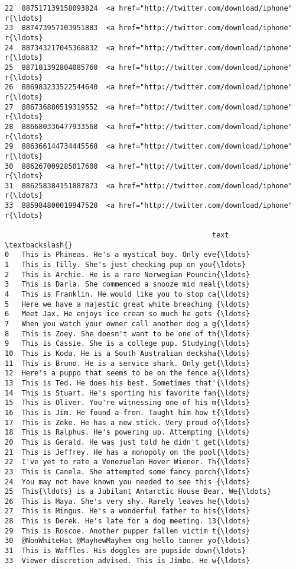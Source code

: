 \documentclass[11pt]{article}
\begin{document}
\begin{Verbatim}[commandchars=\\\{\}]
22  887517139158093824  <a href="http://twitter.com/download/iphone" r{\ldots}   
23  887473957103951883  <a href="http://twitter.com/download/iphone" r{\ldots}   
24  887343217045368832  <a href="http://twitter.com/download/iphone" r{\ldots}   
25  887101392804085760  <a href="http://twitter.com/download/iphone" r{\ldots}   
26  886983233522544640  <a href="http://twitter.com/download/iphone" r{\ldots}   
27  886736880519319552  <a href="http://twitter.com/download/iphone" r{\ldots}   
28  886680336477933568  <a href="http://twitter.com/download/iphone" r{\ldots}   
29  886366144734445568  <a href="http://twitter.com/download/iphone" r{\ldots}   
30  886267009285017600  <a href="http://twitter.com/download/iphone" r{\ldots}   
31  886258384151887873  <a href="http://twitter.com/download/iphone" r{\ldots}   
33  885984800019947520  <a href="http://twitter.com/download/iphone" r{\ldots}   

                                                 text  \textbackslash{}
0   This is Phineas. He's a mystical boy. Only eve{\ldots}   
1   This is Tilly. She's just checking pup on you{\ldots}   
2   This is Archie. He is a rare Norwegian Pouncin{\ldots}   
3   This is Darla. She commenced a snooze mid meal{\ldots}   
4   This is Franklin. He would like you to stop ca{\ldots}   
5   Here we have a majestic great white breaching {\ldots}   
6   Meet Jax. He enjoys ice cream so much he gets {\ldots}   
7   When you watch your owner call another dog a g{\ldots}   
8   This is Zoey. She doesn't want to be one of th{\ldots}   
9   This is Cassie. She is a college pup. Studying{\ldots}   
10  This is Koda. He is a South Australian decksha{\ldots}   
11  This is Bruno. He is a service shark. Only get{\ldots}   
12  Here's a puppo that seems to be on the fence a{\ldots}   
13  This is Ted. He does his best. Sometimes that'{\ldots}   
14  This is Stuart. He's sporting his favorite fan{\ldots}   
15  This is Oliver. You're witnessing one of his m{\ldots}   
16  This is Jim. He found a fren. Taught him how t{\ldots}   
17  This is Zeke. He has a new stick. Very proud o{\ldots}   
18  This is Ralphus. He's powering up. Attempting {\ldots}   
20  This is Gerald. He was just told he didn't get{\ldots}   
21  This is Jeffrey. He has a monopoly on the pool{\ldots}   
22  I've yet to rate a Venezuelan Hover Wiener. Th{\ldots}   
23  This is Canela. She attempted some fancy porch{\ldots}   
24  You may not have known you needed to see this {\ldots}   
25  This{\ldots} is a Jubilant Antarctic House Bear. We{\ldots}   
26  This is Maya. She's very shy. Rarely leaves he{\ldots}   
27  This is Mingus. He's a wonderful father to his{\ldots}   
28  This is Derek. He's late for a dog meeting. 13{\ldots}   
29  This is Roscoe. Another pupper fallen victim t{\ldots}   
30  @NonWhiteHat @MayhewMayhem omg hello tanner yo{\ldots}   
31  This is Waffles. His doggles are pupside down{\ldots}   
33  Viewer discretion advised. This is Jimbo. He w{\ldots}   


\end{Verbatim}
\end{document}
